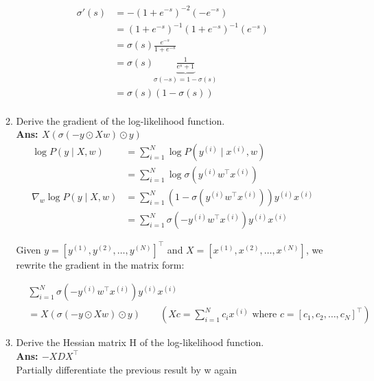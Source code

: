 \documentclass{article}
\theoremstyle{definition}
\theoremstyle{remark}
\begin{document}
\begin{enumerate}[font={\Large\bfseries},left=0pt]
\begin{tcolorbox}
\begin{enumerate}
			      \begin{align}
				      \sigma'(s) & = -(1 + e^{-s})^{-2} (-e^{-s})                                          \\
				                 & = (1 + e^{-s})^{-1} (1 + e^{-s})^{-1}(e^{-s})                           \\
				                 & = \sigma(s) \frac{e^{-s}}{1 + e^{-s}}                                   \\
				                 & = \sigma(s) \underbrace{\frac{1}{e^s + 1}}_{\sigma(-s) = 1 - \sigma(s)} \\
				                 & = \sigma(s)(1 - \sigma(s))                                              \\
			      \end{align}

			\item Derive the gradient of the log-likelihood function. \\
			      \textbf{Ans: $X(\sigma(-y\odot Xw) \odot y)$}
			      \begin{align}
				      \log P(y \mid X, w)          & = \sum^{N}_{i = 1} \log P(y^{(i)} \mid x^{(i)}, w)                        \\
				                                   & = \sum^{N}_{i = 1} \log \sigma(y^{(i)}w^\intercal x^{(i)})                \\
				      \nabla_w \log P(y \mid X, w) & = \sum^{N}_{i = 1} (1 - \sigma(y^{(i)}w^\intercal x^{(i)}))y^{(i)}x^{(i)} \\
				                                   & = \sum^{N}_{i = 1} \sigma(- y^{(i)}w^\intercal x^{(i)})y^{(i)}x^{(i)}
			      \end{align}

			      Given $y = \left[y^{(1)}, y^{(2)}, \dots, y^{(N)}\right]^\intercal$ and  $X = \left[x^{(1)}, x^{(2)}, \dots, x^{(N)}\right]$, we rewrite the gradient in the matrix form:

			      \begin{align}
				       & \sum^{N}_{i = 1} \sigma(- y^{(i)}w^\intercal x^{(i)})y^{(i)}x^{(i)}                                                                        \\
				       & = X(\sigma(-y\odot Xw) \odot y) \quad\quad (Xc = \sum^N_{i = 1} c_i x^{(i)}\text{ where } c = \left[c_1, c_2, \dots, c_N\right]^\intercal)
			      \end{align}

			\item Derive the Hessian matrix H of the log-likelihood function. \\
			      \textbf{Ans: $-X D X^\intercal$} \\
			      Partially differentiate the previous result by w again


\end{enumerate}
\end{tcolorbox}
\end{enumerate}
\end{document}

